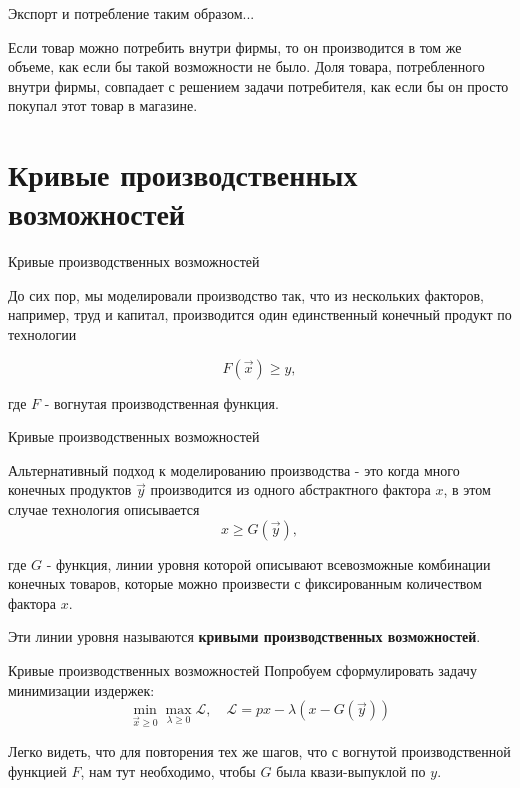 \documentclass{beamer}
\begin{document}
\begin{frame}{Экспорт и потребление}
таким образом...
\begin{lemma}
	Если товар можно потребить внутри фирмы, то он производится в том же объеме, как если бы такой возможности не было. Доля товара, потребленного внутри фирмы, совпадает с решением задачи потребителя, как если бы он просто покупал этот товар в магазине.
\end{lemma}
\end{frame}

\section{Кривые производственных возможностей}

\begin{frame}{Кривые производственных возможностей}

До сих пор, мы моделировали производство так, что из нескольких факторов, например, труд и капитал, производится один единственный конечный продукт по технологии 

$$ F(\vec x) \geqslant y,$$

где $F$ - вогнутая производственная функция. 

\end{frame}

\begin{frame}{Кривые производственных возможностей}

Альтернативный подход к моделированию производства - это когда много конечных продуктов $\vec y$ производится из одного абстрактного фактора $x$, в этом случае технология описывается
$$ x \geqslant G(\vec y),$$

где $G$ - функция, линии уровня которой описывают всевозможные комбинации конечных товаров, которые можно произвести с фиксированным количеством фактора $x$. 

Эти линии уровня называются \textbf{кривыми производственных возможностей}.
\end{frame}

\begin{frame}{Кривые производственных возможностей}
Попробуем сформулировать задачу минимизации издержек:
$$ \min_{\vec x \geqslant 0} \max_{\lambda \geqslant 0} \mathcal{L}, \quad \mathcal{L} = p x - \lambda (x - G(\vec y))$$

Легко видеть, что для повторения тех же шагов, что с вогнутой производственной функцией $F$, нам тут необходимо, чтобы $G$ была квази-выпуклой по $y$. 
\end{frame}
\end{document}
